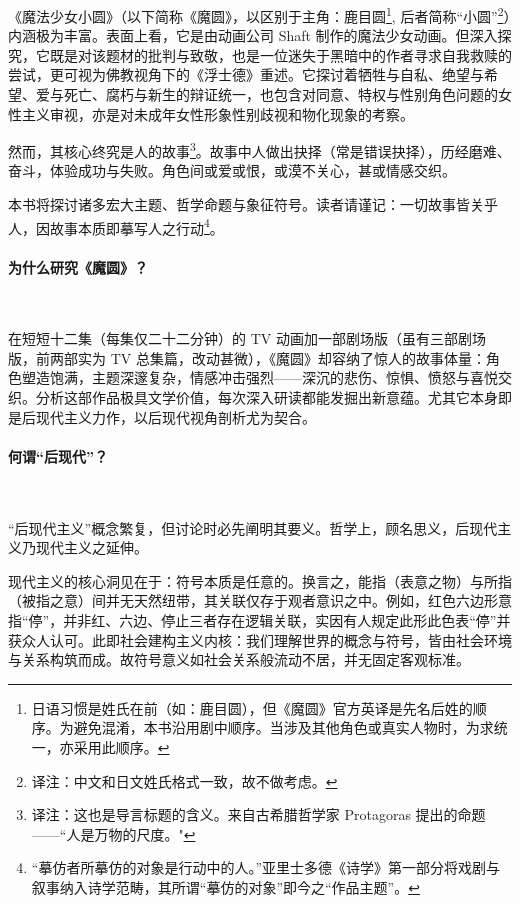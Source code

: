 《魔法少女小圆》（以下简称《魔圆》，以区别于主角：鹿目圆\footnote{日语习惯是姓氏在前（如：鹿目圆），但《魔圆》官方英译是先名后姓的顺序。为避免混淆，本书沿用剧中顺序。当涉及其他角色或真实人物时，为求统一，亦采用此顺序。}, 后者简称“小圆”\footnote{译注：中文和日文姓氏格式一致，故不做考虑。}）内涵极为丰富。表面上看，它是由动画公司 Shaft 制作的魔法少女动画。但深入探究，它既是对该题材的批判与致敬，也是一位迷失于黑暗中的作者寻求自我救赎的尝试，更可视为佛教视角下的《浮士德》重述。它探讨着牺牲与自私、绝望与希望、爱与死亡、腐朽与新生的辩证统一，也包含对同意、特权与性别角色问题的女性主义审视，亦是对未成年女性形象性别歧视和物化现象的考察。

然而，其核心终究是人的故事\footnote{译注：这也是导言标题的含义。来自古希腊哲学家 Protagoras 提出的命题——``人是万物的尺度。"}。故事中人做出抉择（常是错误抉择），历经磨难、奋斗，体验成功与失败。角色间或爱或恨，或漠不关心，甚或情感交织。

本书将探讨诸多宏大主题、哲学命题与象征符号。读者请谨记：一切故事皆关乎人，因故事本质即摹写人之行动\footnote{ “摹仿者所摹仿的对象是行动中的人。”亚里士多德《诗学》第一部分将戏剧与叙事纳入诗学范畴，其所谓“摹仿的对象”即今之“作品主题”。}\cite{ref1}。 
\paragraph{为什么研究《魔圆》？}~{}

在短短十二集（每集仅二十二分钟）的 TV 动画加一部剧场版（虽有三部剧场版，前两部实为 TV 总集篇，改动甚微），《魔圆》却容纳了惊人的故事体量：角色塑造饱满，主题深邃复杂，情感冲击强烈——深沉的悲伤、惊惧、愤怒与喜悦交织。分析这部作品极具文学价值，每次深入研读都能发掘出新意蕴。尤其它本身即是后现代主义力作，以后现代视角剖析尤为契合。
\paragraph{何谓“后现代”？}~{}

“后现代主义”概念繁复，但讨论时必先阐明其要义。哲学上，顾名思义，后现代主义乃现代主义之延伸。

现代主义的核心洞见在于：符号本质是任意的。换言之，能指（表意之物）与所指（被指之意）间并无天然纽带，其关联仅存于观者意识之中。例如，红色六边形意指“停”，并非红、六边、停止三者存在逻辑关联，实因有人规定此形此色表“停”并获众人认可。此即社会建构主义内核：我们理解世界的概念与符号，皆由社会环境与关系构筑而成。故符号意义如社会关系般流动不居，并无固定客观标准\cite{ref2}。

